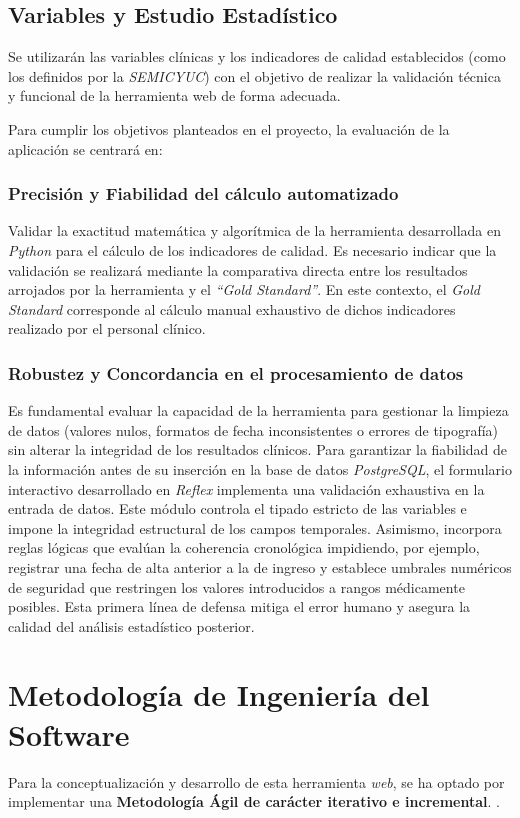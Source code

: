 \subsection{Variables y Estudio Estadístico}
Se utilizarán las variables clínicas y los indicadores de calidad establecidos (como los definidos por la \textit{SEMICYUC}) con el objetivo de realizar la validación técnica y funcional de la herramienta web de forma adecuada. 

Para cumplir los objetivos planteados en el proyecto, la evaluación de la aplicación se centrará en: 

\subsubsection{Precisión y Fiabilidad del cálculo automatizado}
Validar la exactitud matemática y algorítmica de la herramienta desarrollada en \textit{Python} para el cálculo de los indicadores de calidad. Es necesario indicar que la validación se realizará mediante la comparativa directa entre los resultados arrojados por la herramienta y el \textit{“Gold Standard”}. En este contexto, el \textit{Gold Standard} corresponde al cálculo manual exhaustivo de dichos indicadores realizado por el personal clínico.

\subsubsection{Robustez y Concordancia en el procesamiento de datos}
Es fundamental evaluar la capacidad de la herramienta para gestionar la limpieza de datos (valores nulos, formatos de fecha inconsistentes o errores de tipografía) sin alterar la integridad de los resultados clínicos. Para garantizar la fiabilidad de la información antes de su inserción en la base de datos \textit{PostgreSQL}, el formulario interactivo desarrollado en \textit{Reflex} implementa una validación exhaustiva en la entrada de datos. Este módulo controla el tipado estricto de las variables e impone la integridad estructural de los campos temporales. Asimismo, incorpora reglas lógicas que evalúan la coherencia cronológica impidiendo, por ejemplo, registrar una fecha de alta anterior a la de ingreso y establece umbrales numéricos de seguridad que restringen los valores introducidos a rangos médicamente posibles. Esta primera línea de defensa mitiga el error humano y asegura la calidad del análisis estadístico posterior.

\section{Metodología de Ingeniería del Software}
Para la conceptualización y desarrollo de esta herramienta \textit{web}, se ha optado por implementar una \textbf{Metodología Ágil de carácter iterativo e incremental}. \cite{sommerville2015}. 

